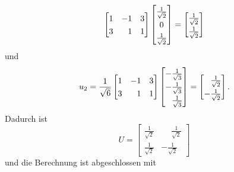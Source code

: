 \begin{example}
\begin{equation*}
        \begin{bmatrix}
            1 & -1 & 3 \\
            3 & \phantom{-}1 & 1
        \end{bmatrix}
        \begingroup
        \renewcommand{\arraystretch}{1.3}
        \begin{bmatrix}
            \frac{1}{\sqrt{2}} \\
            0 \\
            \frac{1}{\sqrt{2}} \\
        \end{bmatrix}
        =
        \begin{bmatrix}
            \frac{1}{\sqrt{2}} \\
            \frac{1}{\sqrt{2}} \\
        \end{bmatrix}
        \endgroup
    \end{equation*}
    und
    \begin{equation*}
        u_2 = \frac{1}{\sqrt{6}}
        \begin{bmatrix}
            1 & -1 & 3 \\
            3 & \phantom{-}1 & 1
        \end{bmatrix}
        \begingroup
        \renewcommand{\arraystretch}{1.3}
        \begin{bmatrix}
            -\frac{1}{\sqrt{3}} \\
            -\frac{1}{\sqrt{3}} \\
            \phantom{-}\frac{1}{\sqrt{3}} \\
        \end{bmatrix}
        =
        \begin{bmatrix}
            \phantom{-}\frac{1}{\sqrt{2}} \\
            -\frac{1}{\sqrt{2}} \\
        \end{bmatrix}
        \endgroup
        .
    \end{equation*}
    Dadurch ist 
    \begin{equation*}
        \renewcommand{\arraystretch}{1.3}
        U =
        \begin{bmatrix}
            \frac{1}{\sqrt{2}} & \phantom{-}\frac{1}{\sqrt{2}} \\
            \frac{1}{\sqrt{2}} & -\frac{1}{\sqrt{2}}
        \end{bmatrix}
    \end{equation*}
    und die Berechnung ist abgeschlossen mit

\end{example}
